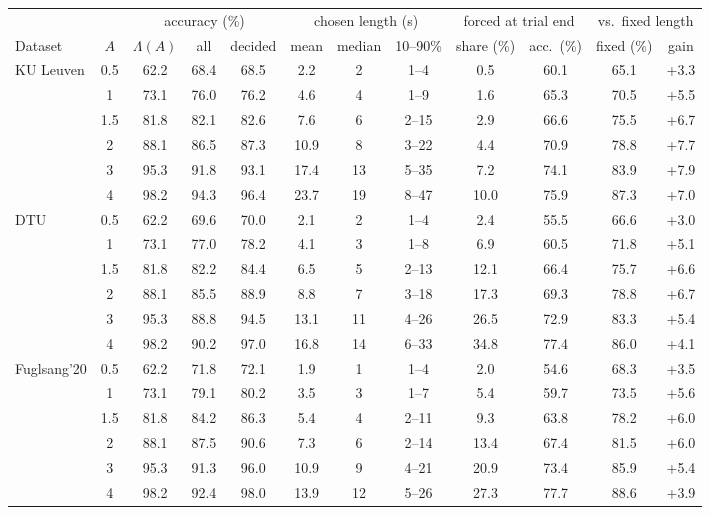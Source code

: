 \begin{tabular}{lccccccccccc}\toprule
& & \multicolumn{3}{c}{accuracy (\%)} & \multicolumn{3}{c}{chosen length (s)} & \multicolumn{2}{c}{forced at trial end} & \multicolumn{2}{c}{vs.\ fixed length} \\
\cmidrule(lr){3-5}\cmidrule(lr){6-8}\cmidrule(lr){9-10}\cmidrule(lr){11-12}
Dataset & $A$ & $\Lambda(A)$ & all & decided & mean & median & 10--90\% & share (\%) & acc.\ (\%) & fixed (\%) & gain \\\midrule
KU Leuven & 0.5 & 62.2 & 68.4 & 68.5 & 2.2 & 2 & 1--4 & 0.5 & 60.1 & 65.1 & +3.3 \\
 & 1 & 73.1 & 76.0 & 76.2 & 4.6 & 4 & 1--9 & 1.6 & 65.3 & 70.5 & +5.5 \\
 & 1.5 & 81.8 & 82.1 & 82.6 & 7.6 & 6 & 2--15 & 2.9 & 66.6 & 75.5 & +6.7 \\
 & 2 & 88.1 & 86.5 & 87.3 & 10.9 & 8 & 3--22 & 4.4 & 70.9 & 78.8 & +7.7 \\
 & 3 & 95.3 & 91.8 & 93.1 & 17.4 & 13 & 5--35 & 7.2 & 74.1 & 83.9 & +7.9 \\
 & 4 & 98.2 & 94.3 & 96.4 & 23.7 & 19 & 8--47 & 10.0 & 75.9 & 87.3 & +7.0 \\
\midrule
DTU & 0.5 & 62.2 & 69.6 & 70.0 & 2.1 & 2 & 1--4 & 2.4 & 55.5 & 66.6 & +3.0 \\
 & 1 & 73.1 & 77.0 & 78.2 & 4.1 & 3 & 1--8 & 6.9 & 60.5 & 71.8 & +5.1 \\
 & 1.5 & 81.8 & 82.2 & 84.4 & 6.5 & 5 & 2--13 & 12.1 & 66.4 & 75.7 & +6.6 \\
 & 2 & 88.1 & 85.5 & 88.9 & 8.8 & 7 & 3--18 & 17.3 & 69.3 & 78.8 & +6.7 \\
 & 3 & 95.3 & 88.8 & 94.5 & 13.1 & 11 & 4--26 & 26.5 & 72.9 & 83.3 & +5.4 \\
 & 4 & 98.2 & 90.2 & 97.0 & 16.8 & 14 & 6--33 & 34.8 & 77.4 & 86.0 & +4.1 \\
\midrule
Fuglsang'20 & 0.5 & 62.2 & 71.8 & 72.1 & 1.9 & 1 & 1--4 & 2.0 & 54.6 & 68.3 & +3.5 \\
 & 1 & 73.1 & 79.1 & 80.2 & 3.5 & 3 & 1--7 & 5.4 & 59.7 & 73.5 & +5.6 \\
 & 1.5 & 81.8 & 84.2 & 86.3 & 5.4 & 4 & 2--11 & 9.3 & 63.8 & 78.2 & +6.0 \\
 & 2 & 88.1 & 87.5 & 90.6 & 7.3 & 6 & 2--14 & 13.4 & 67.4 & 81.5 & +6.0 \\
 & 3 & 95.3 & 91.3 & 96.0 & 10.9 & 9 & 4--21 & 20.9 & 73.4 & 85.9 & +5.4 \\
 & 4 & 98.2 & 92.4 & 98.0 & 13.9 & 12 & 5--26 & 27.3 & 77.7 & 88.6 & +3.9 \\

\end{tabular}
